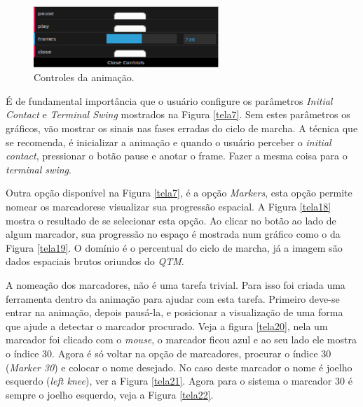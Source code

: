 \begin{figure}[ht]
	\centering
	\includegraphics[width=7cm]{figuras/tela17.eps}
	\caption{Controles da animação.}
	\label{animacao5}
\end{figure}




É de fundamental importância que o usuário configure os parâmetros \emph{Initial Contact} e \emph{Terminal Swing} mostrados na Figura \ref{tela7}. Sem estes parâmetros os gráficos, vão mostrar os sinais nas fases erradas do ciclo de marcha.
A técnica que se recomenda, é inicializar a animação e quando o usuário perceber o \emph{initial contact}, pressionar o botão pause e anotar o frame. Fazer a mesma coisa para o \emph{terminal swing}.

Outra opção disponível na Figura \ref{tela7}, é a opção \emph{Markers}, esta opção permite nomear os marcadorese visualizar sua progressão espacial. A Figura \ref{tela18} mostra o resultado de se selecionar esta opção.
Ao clicar no botão ao lado de algum marcador, sua progressão no espaço é mostrada num gráfico como o da Figura \ref{tela19}. O domínio é o percentual do ciclo de marcha, já a imagem são dados espaciais brutos oriundos do \emph{QTM}.

A nomeação dos marcadores, não é uma tarefa trivial. Para isso foi criada uma ferramenta dentro da animação para ajudar com esta tarefa. Primeiro deve-se entrar na animação, depois pausá-la, e posicionar a visualização de uma forma que ajude a detectar o marcador procurado. Veja a figura \ref{tela20}, nela um marcador foi clicado com o \emph{mouse}, o marcador ficou azul e ao seu lado ele mostra o índice 30. 
Agora é só voltar na opção de marcadores, procurar o índice 30 (\emph{Marker 30}) e colocar o nome desejado. No caso deste marcador o nome é joelho esquerdo (\emph{left knee}), ver a Figura \ref{tela21}.
Agora para o sistema o marcador 30 é sempre o joelho esquerdo, veja a Figura \ref{tela22}.

